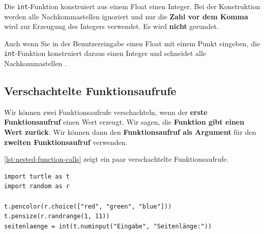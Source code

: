Die \lstinline[language={python3}]{int}-Funktion konstruiert aus einem Float einen Integer. Bei der Konstruktion werden alle Nachkommastellen ignoriert und nur die \textbf{Zahl vor dem Komma} wird zur Erzeugung des Integers verwendet. Es wird \textbf{nicht} gerundet.

\begin{important}
Auch wenn Sie in der Benutzereingabe einen Float mit einem Punkt eingeben, die \lstinline[language={python3}]{int}-Funktion konstruiert daraus einen Integer und schneidet alle Nachkommastellen .
\end{important}

\subsection{Verschachtelte Funktionsaufrufe}

Wir können zwei Funktionsaufrufe verschachteln, wenn der \textbf{erste Funktionsaufruf} einen Wert erzeugt. Wir sagen, die \textbf{Funktion gibt einen Wert zurück}. Wir können dann den \textbf{Funktionsaufruf als Argument} für den \textbf{zweiten Funktionsaufruf} verwenden.

\begin{example}
\autoref{lst:nested-function-calls} zeigt ein paar verschachtelte Funktionsaufrufe.

\begin{lstlisting}[language={python3}, label={lst:nested-function-calls}, caption={Der innere Funktionsaufruf erzeugt jeweils einen Wert.}]
import turtle as t
import random as r

t.pencolor(r.choice(["red", "green", "blue"]))
t.pensize(r.randrange(1, 11))
seitenlaenge = int(t.numinput("Eingabe", "Seitenlänge:"))

\end{lstlisting}

\end{example}

\vspace{-0.5cm}


\vspace{-0.5cm}

